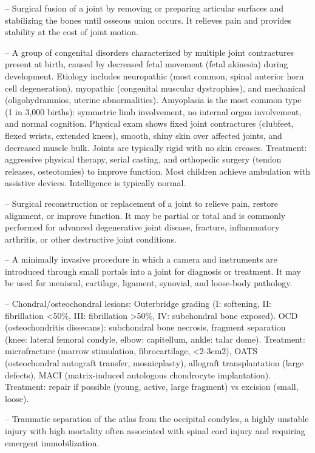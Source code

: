 -- Surgical fusion of a joint by removing or preparing articular surfaces and stabilizing the bones until osseous union occurs. It relieves pain and provides stability at the cost of joint motion.

-- A group of congenital disorders characterized by multiple joint contractures present at birth, caused by decreased fetal movement (fetal akinesia) during development. Etiology includes neuropathic (most common, spinal anterior horn cell degeneration), myopathic (congenital muscular dystrophies), and mechanical (oligohydramnios, uterine abnormalities). Amyoplasia is the most common type (1 in 3,000 births): symmetric limb involvement, no internal organ involvement, and normal cognition. Physical exam shows fixed joint contractures (clubfeet, flexed wrists, extended knees), smooth, shiny skin over affected joints, and decreased muscle bulk. Joints are typically rigid with no skin creases. Treatment: aggressive physical therapy, serial casting, and orthopedic surgery (tendon releases, osteotomies) to improve function. Most children achieve ambulation with assistive devices. Intelligence is typically normal.

-- Surgical reconstruction or replacement of a joint to relieve pain, restore alignment, or improve function. It may be partial or total and is commonly performed for advanced degenerative joint disease, fracture, inflammatory arthritis, or other destructive joint conditions.

-- A minimally invasive procedure in which a camera and instruments are introduced through small portals into a joint for diagnosis or treatment. It may be used for meniscal, cartilage, ligament, synovial, and loose-body pathology.

-- Chondral/osteochondral lesions: Outerbridge grading (I: softening, II: fibrillation <50\%, III: fibrillation >50\%, IV: subchondral bone exposed). OCD (osteochondritis dissecans): subchondral bone necrosis, fragment separation (knee: lateral femoral condyle, elbow: capitellum, ankle: talar dome). Treatment: microfracture (marrow stimulation, fibrocartilage, <2-3cm2), OATS (osteochondral autograft transfer, mosaicplasty), allograft transplantation (large defects), MACI (matrix-induced autologous chondrocyte implantation). Treatment: repair if possible (young, active, large fragment) vs excision (small, loose).

-- Traumatic separation of the atlas from the occipital condyles, a highly unstable injury with high mortality often associated with spinal cord injury and requiring emergent immobilization.


